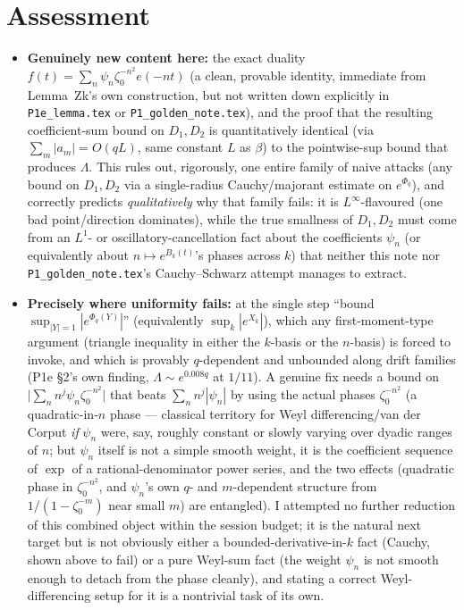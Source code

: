 \documentclass[11pt]{article}
\theoremstyle{remark}\newtheorem{remark}[theorem]{Remark}
\begin{document}
\section{Assessment}
\begin{itemize}
\item \textbf{Genuinely new content here:} the exact duality $f(t)=\sum_n\psi_n\zeta_0^{-n^2}e(-nt)$ (a clean, provable identity, immediate from Lemma~Zk's own construction, but not written down explicitly in \texttt{P1e\_lemma.tex} or \texttt{P1\_golden\_note.tex}), and the proof that the resulting coefficient-sum bound on $D_1,D_2$ is quantitatively identical (via $\sum_m|a_m|=O(qL)$, same constant $L$ as $\beta$) to the pointwise-sup bound that produces $\Lambda$. This rules out, rigorously, one entire family of naive attacks (any bound on $D_1,D_2$ via a single-radius Cauchy/majorant estimate on $e^{\Phi_q}$), and correctly predicts \emph{qualitatively} why that family fails: it is $L^\infty$-flavoured (one bad point/direction dominates), while the true smallness of $D_1,D_2$ must come from an $L^1$- or oscillatory-cancellation fact about the coefficients $\psi_n$ (or equivalently about $n\mapsto e^{B_k(t)}$'s phases across $k$) that neither this note nor \texttt{P1\_golden\_note.tex}'s Cauchy--Schwarz attempt manages to extract.
\item \textbf{Precisely where uniformity fails:} at the single step ``bound $\sup_{|Y|=1}|e^{\Phi_q(Y)}|$'' (equivalently $\sup_k|e^{X_k}|$), which any first-moment-type argument (triangle inequality in either the $k$-basis or the $n$-basis) is forced to invoke, and which is provably $q$-dependent and unbounded along drift families (P1e \S2's own finding, $\Lambda\sim e^{0.008q}$ at $1/11$). A genuine fix needs a bound on $\big|\sum_n n^j\psi_n\zeta_0^{-n^2}\big|$ that beats $\sum_n n^j|\psi_n|$ by using the actual phases $\zeta_0^{-n^2}$ (a quadratic-in-$n$ phase --- classical territory for Weyl differencing/van der Corput \emph{if} $\psi_n$ were, say, roughly constant or slowly varying over dyadic ranges of $n$; but $\psi_n$ itself is not a simple smooth weight, it is the coefficient sequence of $\exp$ of a rational-denominator power series, and the two effects (quadratic phase in $\zeta_0^{-n^2}$, and $\psi_n$'s own $q$- and $m$-dependent structure from $1/(1-\zeta_0^{-m})$ near small $m$) are entangled). I attempted no further reduction of this combined object within the session budget; it is the natural next target but is not obviously either a bounded-derivative-in-$k$ fact (Cauchy, shown above to fail) or a pure Weyl-sum fact (the weight $\psi_n$ is not smooth enough to detach from the phase cleanly), and stating a correct Weyl-differencing setup for it is a nontrivial task of its own.

\end{itemize}
\end{document}
